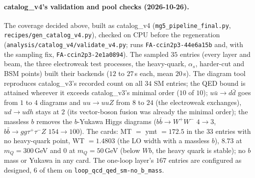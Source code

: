 \documentclass[11pt]{article}
\newcommand{\code}[1]{\texttt{#1}}
\begin{document}
\paragraph{catalog\_v4's validation and pool checks (2026-10-26).}\label{par:v4_validation} The coverage
decided above, built as catalog\_v4 (\code{mg5\_pipeline\_final.py}, \code{recipes/gen\_catalog\_v4.py}), checked on
CPU before the regeneration (\code{analysis/catalog\_v4/validate\_v4.py}; runs \code{FA-ccin2p3-44e6a15b} and, with
the sampling fix, \code{FA-ccin2p3-2e1a0894}).
The sampled $35$ entries (every layer and beam, the three electroweak test processes, the heavy-quark, $\alpha_s$,
harder-cut and BSM points) built their backends ($12$ to $27$\,s each, mean $20$\,s). The diagram tool reproduces
catalog\_v3's recorded count on all $34$ SM entries; the QED bound is attained wherever it exceeds catalog\_v3's
minimal order ($10$ of $10$); $u\bar u\to d\bar d$ goes from $1$ to $4$ diagrams and $uu\to uuZ$ from $8$ to $24$
(the electroweak exchanges), $ud\to udh$ stays at $2$ (its vector-boson fusion was already the minimal order); the
massless $b$ removes the $b$-Yukawa Higgs diagrams ($b\bar b\to W^+W^-$ $4\to3$, $b\bar b\to gg\tau^+\tau^-Z$
$154\to100$). The cards: MT $=$ ymt $=172.5$ in the $33$ entries with no heavy-quark point, WT $=1.4803$ (the LO
width with a massless $b$), $8.73$ at $m_Q=300$\,GeV and $0$ at $m_Q=50$\,GeV (below $Wb$, the heavy quark is
stable); no $b$ mass or Yukawa in any card. The one-loop layer's $167$ entries are configured as designed, $6$ of
them on \code{loop\_qcd\_qed\_sm-no\_b\_mass}.
\end{document}
